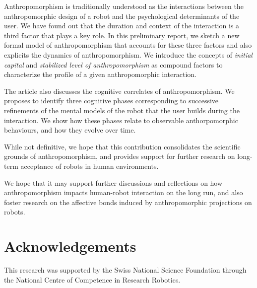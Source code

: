 \documentclass{sig-alternate-2013}
\begin{document}
Anthropomorphism is traditionally understood as the interactions between the
anthropomorphic design of a robot and the psychological determinants of the
user. We have found out that the duration and context of the interaction is a
third factor that plays a key role. In this preliminary report, we sketch a new
formal model of anthropomorphism that accounts for these three factors and also
explicits the dynamics of anthropomorphism. We introduce the concepts of
\emph{initial capital} and \emph{stabilized level of anthropomorphism} as
compound factors to characterize the profile of a given anthropomorphic
interaction.

The article also discusses the cognitive correlates of anthropomorphism. We
proposes to identify three cognitive phases corresponding to successive
refinements of the mental models of the robot that the user builds during the
interaction. We show how these phases relate to observable anthorpomorphic
behaviours, and how they evolve over time.

While not definitive, we hope that this contribution consolidates the
scientific grounds of anthropomorphism, and provides support for further
research on long-term acceptance of robots in human environments.

We hope that it may support further
discussions and reflections on how anthropomorphism impacts human-robot
interaction on the long run, and also foster research on the affective bonds
induced by anthropomorphic projections on robots.

\section*{Acknowledgements}
This research was supported by the Swiss National Science Foundation through
the National Centre of Competence in Research Robotics.


 
\end{document}

